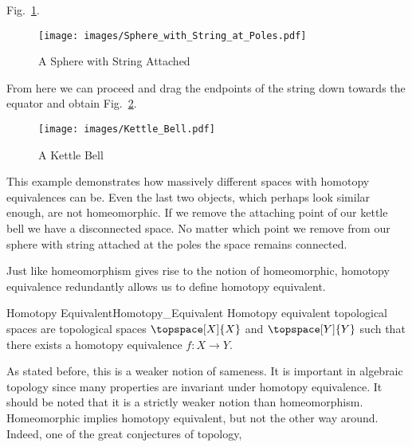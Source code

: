 \documentclass{book}                                                           %
\begin{document}
                Fig.~\ref{fig:Sphere_with_String_Attached}. 
                \begin{figure}[H]
                    \centering
                    \captionsetup{type=figure}
                    \texttt{[image: images/Sphere\_with\_String\_at\_Poles.pdf]}
                    \caption{A Sphere with String Attached}
                    \label{fig:Sphere_with_String_Attached}
                \end{figure}From here
                we can proceed and drag the endpoints of the string down towards
                the equator and obtain Fig.~\ref{fig:Kettle_Bell}.
                \begin{figure}
                    \centering
                    \captionsetup{type=figure}
                    \texttt{[image: images/Kettle\_Bell.pdf]}
                    \caption{A Kettle Bell}
                    \label{fig:Kettle_Bell}
                \end{figure}
                This example demonstrates how massively different spaces with
                homotopy equivalences can be. Even the last two objects, which
                perhaps look similar enough, are not homeomorphic. If we remove
                the attaching point of our kettle bell we have a disconnected
                space. No matter which point we remove from our sphere with
                string attached at the poles the space remains connected.
                \par\hfill\par
                Just like homeomorphism gives rise to the notion of
                homeomorphic, homotopy equivalence redundantly allows us to
                define homotopy equivalent.
                \begin{fdefinition}{Homotopy Equivalent}{Homotopy_Equivalent}
                    Homotopy equivalent topological spaces are topological
                    spaces $\topspace[X]{X}$ and $\topspace[Y]{Y}$ such that
                    there exists a homotopy equivalence $f:X\rightarrow{Y}$.
                \end{fdefinition}
                As stated before, this is a weaker notion of sameness. It is
                important in algebraic topology since many properties are
                invariant under homotopy equivalence. It should be noted that it
                is a strictly weaker notion than homeomorphism. Homeomorphic
                implies homotopy equivalent, but not the other way around.
                Indeed, one of the great conjectures of topology,
\end{document}
